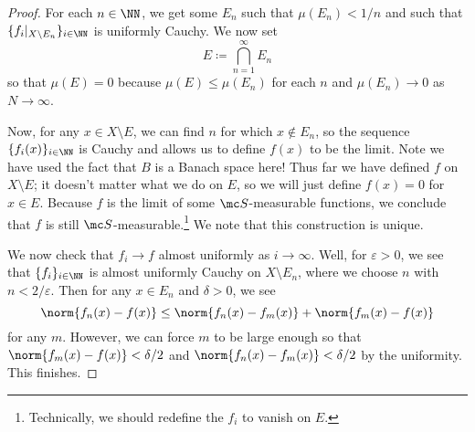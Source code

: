 \documentclass[../notes.tex]{subfiles}
\begin{document}
\begin{proof}
	For each $n\in\NN$, we get some $E_n$ such that $\mu(E_n)<1/n$ and such that $\{f_i|_{X\setminus E_n}\}_{i\in\NN}$ is uniformly Cauchy. We now set
	\[E\coloneqq\bigcap_{n=1}^\infty E_n\]
	so that $\mu(E)=0$ because $\mu(E)\le\mu(E_n)$ for each $n$ and $\mu(E_n)\to0$ as $N\to\infty$.

	Now, for any $x\in X\setminus E$, we can find $n$ for which $x\notin E_n$, so the sequence $\{f_i(x)\}_{i\in\NN}$ is Cauchy and allows us to define $f(x)$ to be the limit. Note we have used the fact that $B$ is a Banach space here! Thus far we have defined $f$ on $X\setminus E$; it doesn't matter what we do on $E$, so we will just define $f(x)=0$ for $x\in E$. Because $f$ is the limit of some $\mc S$-measurable functions, we conclude that $f$ is still $\mc S$-measurable.\footnote{Technically, we should redefine the $f_i$ to vanish on $E$.} We note that this construction is unique.

	We now check that $f_i\to f$ almost uniformly as $i\to\infty$. Well, for $\varepsilon>0$, we see that $\{f_i\}_{i\in\NN}$ is almost uniformly Cauchy on $X\setminus E_n$, where we choose $n$ with $n<2/\varepsilon$. Then for any $x\in E_n$ and $\delta>0$, we see
	\[\norm{f_n(x)-f(x)}\le\norm{f_n(x)-f_m(x)}+\norm{f_m(x)-f(x)}\]
	for any $m$. However, we can force $m$ to be large enough so that $\norm{f_m(x)-f(x)}<\delta/2$ and $\norm{f_n(x)-f_m(x)}<\delta/2$ by the uniformity. This finishes.
\end{proof}
\end{document}
